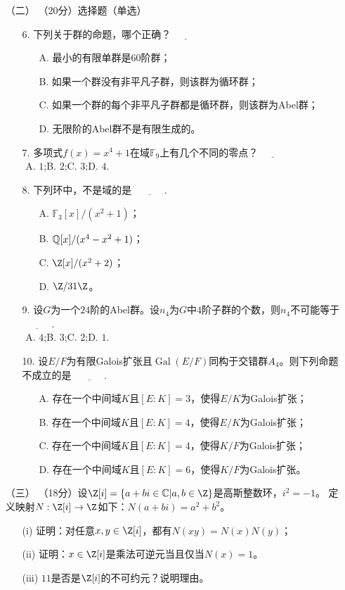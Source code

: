 \begin{itemize}
\item[（二）]（20分）选择题（单选）
\begin{itemize}
\item[6.] 下列关于群的命题，哪个正确？$\underline{\qquad\quad}$
\begin{itemize}
    \item[A.] 最小的有限单群是$60$阶群；
    \item[B.] 如果一个群没有非平凡子群，则该群为循环群；
    \item[C.] 如果一个群的每个非平凡子群都是循环群，则该群为Abel群；
    \item[D.] 无限阶的Abel群不是有限生成的。
\end{itemize}
\item[7.] 多项式$f(x)=x^4+1$在域$\mathbb{F}_9$上有几个不同的零点？$\underline{\qquad\quad}$\\
\,\,A. $1$;\qquad\qquad B. $2$;\qquad\qquad C. $3$;\qquad\qquad D. $4$.
\item[8.] 下列环中，不是域的是 $\underline{\qquad\quad}$.
\begin{itemize}
    \item[A.] $\mathbb{F}_3[x]/(x^2+1)$；
    \item[B.] $\mathbb{Q}[x]/(x^4-x^2+1)$；
    \item[C.] $\Z[x]/(x^2+2)$；
    \item[D.] $\Z/31\Z$。
\end{itemize}
\item[9.] 设$G$为一个$24$阶的Abel群。设$n_4$为$G$中$4$阶子群的个数，则$n_4$不可能等于 $\underline{\qquad\quad}$.\\
\,\,A. $4$;\qquad\qquad B. $3$;\qquad\qquad C. $2$;\qquad\qquad D. $1$.
\item[10.] 设$E/F$为有限Galois扩张且$\operatorname{Gal}(E/F)$同构于交错群$A_4$。则下列命题不成立的是 $\underline{\qquad\quad}$.
\begin{itemize}
    \item[A.] 存在一个中间域$K$且$[E:K]=3$，使得$E/K$为Galois扩张；
    \item[B.] 存在一个中间域$K$且$[E:K]=4$，使得$E/K$为Galois扩张；
    \item[C.] 存在一个中间域$K$且$[E:K]=4$，使得$K/F$为Galois扩张；
    \item[D.] 存在一个中间域$K$且$[E:K]=6$，使得$K/F$为Galois扩张。
\end{itemize}
\end{itemize}

\item[（三）]（18分）设$\Z[i]=\{a+bi\in\mathbb{C}|a,b\in\Z\}$是高斯整数环，$i^2=-1$。
定义映射$N:\Z[i]\to\Z$如下：$N(a+bi)=a^2+b^2$。
\begin{itemize}
    \item[(i)] 证明：对任意$x,y\in\Z[i]$，都有$N(xy)=N(x)N(y)$；
    \item[(ii)] 证明：$x\in\Z[i]$是乘法可逆元当且仅当$N(x)=1$。
    \item[(iii)] $11$是否是$\Z[i]$的不可约元？说明理由。
\end{itemize}


\end{itemize}
